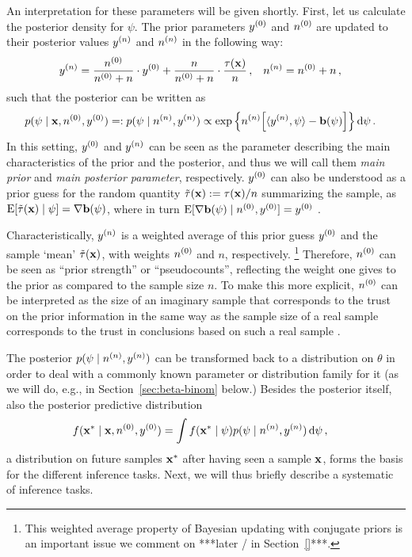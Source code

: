An interpretation for these parameters will be given shortly.
First, let us calculate the posterior density for $\psi$.
The prior parameters $y^{(0)}$ and $n^{(0)}$ are updated to their posterior values $y^{(n)}$ and $n^{(n)}$ in the following way:
\begin{align}\label{eq:canonicalupdate}
y^{(n)} &= \frac{n^{(0)}}{n^{(0)} + n} \cdot y^{(0)} + \frac{n}{n^{(0)} + n} \cdot \frac{\tau(\mathbf{x})}{n}\,, &
n^{(n)} &= n^{(0)} + n\,,
\end{align}
such that the posterior can be written as
\begin{align}\label{eq:canonicalposterior}
p(\psi \mid \mathbf{x}, n^{(0)}, y^{(0)})
 =: p(\psi \mid n^{(n)}, y^{(n)})
 &\propto \exp\Big\{ n^{(n)} \Big[ \langle y^{(n)}, \psi \rangle - \mathbf{b}(\psi) \Big] \Big\} \,\mathrm{d}\psi\,.
\end{align}
In this setting, $y^{(0)}$ and $y^{(n)}$ can be seen as the parameter describing the main characteristics of the prior and the posterior,
and thus we will call them \emph{main prior} and \emph{main posterior parameter}, respectively.
$y^{(0)}$ can also be understood as a prior guess for the random quantity $\tilde{\tau}(\mathbf{x}) := \tau(\mathbf{x})/n$ summarizing the sample,
as $\operatorname{E}[\tilde{\tau}(\mathbf{x}) \mid \psi] = \nabla\mathbf{b}(\psi)$,
where in turn $\operatorname{E}[\nabla\mathbf{b}(\psi) \mid n^{(0)}, y^{(0)}] = y^{(0)}$ \cite[Prop.~5.7, p.~275]{2000:bernardosmith}.

Characteristically, $y^{(n)}$ is a weighted average of this prior guess $y^{(0)}$ and the sample `mean' $\tilde{\tau}(\mathbf{x})$,
with weights $n^{(0)}$ and $n$, respectively.%
\footnote{This weighted average property of Bayesian updating with conjugate priors is an important issue
we comment on ***later / in Section~\ref{}***.}
Therefore, $n^{(0)}$ can be seen as ``prior strength'' or ``pseudocounts'',
reflecting the weight one gives to the prior as compared to the sample size $n$.
To make this more explicit, $n^{(0)}$ can be interpreted as the size of an imaginary sample
that corresponds to the trust on the prior information in the same way
as the sample size of a real sample
corresponds to the trust in conclusions based on such a real sample \cite[p.~258]{Walter2009a}.

The posterior $p(\psi \mid n^{(n)}, y^{(n)})$ can be transformed back to a distribution on $\theta$
in order to deal with a commonly known parameter or distribution family for it
(as we will do, e.g., in Section~\ref{sec:beta-binom} below.)
Besides the posterior itself, also the posterior predictive distribution
\begin{align}
\label{eq:posteriorpredictive}
f(\mathbf{x}^*\mid\mathbf{x}, n^{(0)}, y^{(0)}) &= \int f(\mathbf{x}^* \mid \psi) p(\psi \mid n^{(n)}, y^{(n)}) \,\mathrm{d}\psi\,,
\end{align}
a distribution on future samples $\mathbf{x}^*$ after having seen a sample $\mathbf{x}$,
forms the basis for the different inference tasks. %
Next, we will thus briefly describe a systematic of inference tasks.



